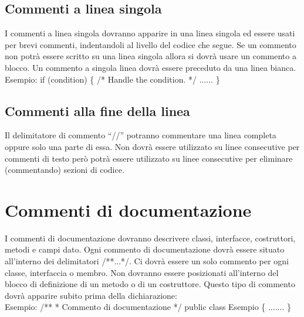 \documentclass[11pt,titlepage,a4paper]{report}
\begin{document}
\subsection{Commenti a linea singola}
I commenti a linea singola dovranno apparire in una linea singola ed essere usati per brevi commenti, indentandoli al livello del codice che segue. Se un commento non potr\`a essere scritto su una linea singola allora si dovr\`a usare un commento a blocco. Un commento a singola linea dovr\`a essere preceduto da una linea bianca. \\
Esempio: \newline
if (condition) \{ \newline
        /* Handle the condition. */ \newline
        ...... \newline
\} \newline

\subsection{Commenti alla fine della linea}
Il delimitatore di commento ``//'' potranno commentare una linea completa oppure solo una parte di essa. Non dovr\`a essere utilizzato su linee consecutive per commenti di testo per\`o potr\`a essere utilizzato su linee consecutive per eliminare (commentando) sezioni di codice.

\section{Commenti di documentazione}
I commenti di documentazione dovranno descrivere classi, interfacce, costruttori, metodi e campi dato. Ogni commento di documentazione dovr\`a essere situato all'interno dei delimitatori /**...*/. Ci dovr\`a essere un solo commento per ogni classe, interfaccia o membro. Non dovranno essere posizionati all'interno del blocco di definizione di un metodo o di un costruttore. Questo tipo di commento dovr\`a apparire subito prima della dichiarazione:\\
Esempio:\newline
/** \newline
* Commento di documentazione \newline
*/ \newline
public class Esempio \{ \newline
    ....... \newline
\} \newline
\end{document}
